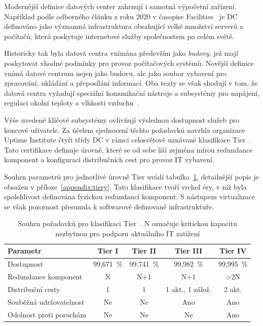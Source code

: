 Modernější definice datových center zahrnují i samotná výpočetní zařízení. Například podle odborného článku z roku 2020 v časopise Facilities~\cite{fadaeefath_abadi_data_2020} je DC definováno jako významná infrastruktura obsahující velké množství serverů a počítačů, která poskytuje internetové služby společnostem po celém světě.

Historicky tak byla datová centra vnímána především jako \textit{budovy}, jež mají poskytovat vhodné podmínky pro provoz počítačových systémů. Novější definice vnímá datové centrum nejen jako budovu, ale jako soubor vybavení pro zpracování, ukládání a přeposílání informací. Oba texty se však shodují v tom, že datová centra vyžadují speciální komunikační nástroje a subsystémy pro napájení, regulaci okolní teploty a vlhkosti vzduchu~\cite{tatnall_reflections_2012, fadaeefath_abadi_data_2020}.

Výše uvedené klíčové subsystémy ovlivňují výslednou dostupnost služeb pro koncové uživatele. Za účelem sjednocení těchto požadavků navrhla organizace Uptime Institute čtyři třídy DC v rámci celosvětově uznávané klasifikace Tier~\cite{turner_iv_tier_2008}. Tato certifikace definuje úrovně, které se od sebe liší zejména mírou redundance komponent a konfigurací distribučních cest pro provoz IT vybavení.

Souhrn parametrů pro jednotlivé úrovně Tier uvádí tabulka~\ref{tab:uptime_tiers}, detailnější popis je obsažen v příloze~\ref{appendix:tiery}. Tato klasifikace tvoří vrchol éry, v níž byla spolehlivost definována fyzickou redundancí komponent. S nástupem virtualizace se však pozornost přesunula k softwarově definované infrastruktuře.

\begin{table}[t] \centering \setlength{\tabcolsep}{4pt}

    \caption[Souhrn požadavků pro klasifikaci Tier]{Souhrn požadavků pro klasifikaci Tier~\cite[s.~13]{turner_iv_tier_2008}. N označuje kritickou kapacitu nezbytnou pro podporu aktuálního IT zatížení}
    \label{tab:uptime_tiers}
    
    \begin{tabular}{lcccc}
        \toprule
        \textbf{Parametr} & \textbf{Tier I} & \textbf{Tier II} & \textbf{Tier III} & \textbf{Tier IV} \\
        \midrule
        Dostupnost & 99,671~\% & 99,741~\% & 99,982~\% & 99,995~\% \\
        Redundance komponent & N & N+1 & N+1 & >2N \\
        Distribuční cesty & 1 & 1 & 1 akt., 1 zálož. & 2 akt. \\
        Souběžná udržovatelnost & Ne & Ne & Ano & Ano \\
        Odolnost proti poruchám & Ne & Ne & Ne & Ano \\
        \bottomrule
    \end{tabular}

\end{table}

